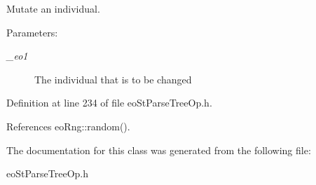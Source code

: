 Mutate an individual. 

\begin{Desc}
\item[Parameters:]
\begin{description}
\item[{\em \_\-eo1}]The individual that is to be changed \end{description}
\end{Desc}


Definition at line 234 of file eo\-St\-Parse\-Tree\-Op.h.

References eo\-Rng::random().

The documentation for this class was generated from the following file:\begin{CompactItemize}
\item 
eo\-St\-Parse\-Tree\-Op.h\end{CompactItemize}
